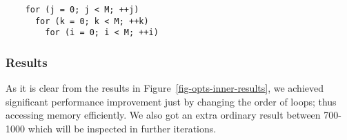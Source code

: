 \begin{verbatim}
    for (j = 0; j < M; ++j)
      for (k = 0; k < M; ++k)
        for (i = 0; i < M; ++i)
\end{verbatim}
\smallskip

\clearpage

\subsubsection{Results}



As it is clear from the results in Figure~\ref{fig-opts-inner-results},
we achieved significant performance improvement just by changing the
order of loops; thus accessing memory efficiently. We also got an extra
ordinary result between 700-1000 which will be inspected in further
iterations.
\medskip
